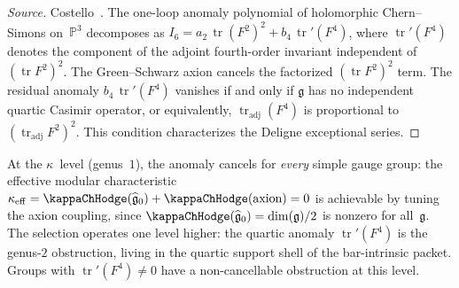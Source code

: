 \begin{proof}[Source]
Costello~\cite{Costello2111}.
The one-loop anomaly polynomial of holomorphic Chern--Simons
on~$\mathbb{P}^3$ decomposes as
$I_6 = a_2\,\operatorname{tr}(F^2)^2
+ b_4\,\operatorname{tr}'(F^4)$,
where $\operatorname{tr}'(F^4)$ denotes the component of the
adjoint fourth-order invariant independent of
$(\operatorname{tr} F^2)^2$.
The Green--Schwarz axion cancels the factorized
$(\operatorname{tr} F^2)^2$ term. The residual anomaly
$b_4\,\operatorname{tr}'(F^4)$ vanishes if and only if
$\mathfrak{g}$ has no independent quartic Casimir operator, or
equivalently,
$\operatorname{tr}_{\mathrm{adj}}(F^4)$ is proportional to
$(\operatorname{tr}_{\mathrm{adj}} F^2)^2$.
This condition characterizes the Deligne exceptional
series.
\end{proof}

\begin{remark}
\label{rem:ht-twistor-genus-level}
At the $\kappa$~level (genus~$1$), the anomaly cancels for
\emph{every} simple gauge group: the effective modular
characteristic
$\kappa_{\mathrm{eff}} = \kappaChHodge(\widehat{\mathfrak{g}}_0)
+ \kappaChHodge(\text{axion}) = 0$
is achievable by tuning the axion coupling, since
$\kappaChHodge(\widehat{\mathfrak{g}}_0) = \dim(\mathfrak{g})/2$
is nonzero for all~$\mathfrak{g}$.
The selection operates one level higher: the quartic
anomaly $\operatorname{tr}'(F^4)$ is the genus-$2$
obstruction, living in the quartic support shell of the
bar-intrinsic packet. Groups with
$\operatorname{tr}'(F^4) \neq 0$ have a non-cancellable
obstruction at this level.
\end{remark}

